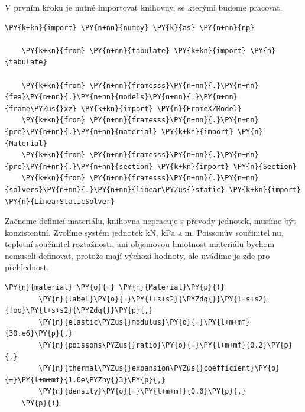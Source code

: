 V prvním kroku je nutné importovat knihovny, se kterými budeme pracovat.

\begin{tcolorbox}[breakable, size=fbox, boxrule=1pt, pad at break*=1mm,colback=cellbackground, colframe=cellborder]
    \begin{Verbatim}[commandchars=\\\{\}]
    \PY{k+kn}{import} \PY{n+nn}{numpy} \PY{k}{as} \PY{n+nn}{np}
    
    \PY{k+kn}{from} \PY{n+nn}{tabulate} \PY{k+kn}{import} \PY{n}{tabulate}
    
    \PY{k+kn}{from} \PY{n+nn}{framesss}\PY{n+nn}{.}\PY{n+nn}{fea}\PY{n+nn}{.}\PY{n+nn}{models}\PY{n+nn}{.}\PY{n+nn}{frame\PYZus{}xz} \PY{k+kn}{import} \PY{n}{FrameXZModel}
    \PY{k+kn}{from} \PY{n+nn}{framesss}\PY{n+nn}{.}\PY{n+nn}{pre}\PY{n+nn}{.}\PY{n+nn}{material} \PY{k+kn}{import} \PY{n}{Material}
    \PY{k+kn}{from} \PY{n+nn}{framesss}\PY{n+nn}{.}\PY{n+nn}{pre}\PY{n+nn}{.}\PY{n+nn}{section} \PY{k+kn}{import} \PY{n}{Section}
    \PY{k+kn}{from} \PY{n+nn}{framesss}\PY{n+nn}{.}\PY{n+nn}{solvers}\PY{n+nn}{.}\PY{n+nn}{linear\PYZus{}static} \PY{k+kn}{import} \PY{n}{LinearStaticSolver}
    \end{Verbatim}
\end{tcolorbox}

Začneme definicí materiálu, knihovna nepracuje s převody jednotek, musíme být konzistentní. Zvolíme systém jednotek $\text{kN, kPa a m}$. Poissonův součinitel \gls{nu}, teplotní součinitel roztažnosti, ani objemovou hmotnost materiálu bychom nemuseli definovat, protože mají výchozí hodnoty, ale uvádíme je zde pro přehlednost.
\begin{tcolorbox}[breakable, size=fbox, boxrule=1pt, pad at break*=1mm,colback=cellbackground, colframe=cellborder]
    \begin{Verbatim}[commandchars=\\\{\}]
    \PY{n}{material} \PY{o}{=} \PY{n}{Material}\PY{p}{(}
        \PY{n}{label}\PY{o}{=}\PY{l+s+s2}{\PYZdq{}}\PY{l+s+s2}{foo}\PY{l+s+s2}{\PYZdq{}}\PY{p}{,}
        \PY{n}{elastic\PYZus{}modulus}\PY{o}{=}\PY{l+m+mf}{30.e6}\PY{p}{,}
        \PY{n}{poissons\PYZus{}ratio}\PY{o}{=}\PY{l+m+mf}{0.2}\PY{p}{,}
        \PY{n}{thermal\PYZus{}expansion\PYZus{}coefficient}\PY{o}{=}\PY{l+m+mf}{1.0e\PYZhy{}3}\PY{p}{,}
        \PY{n}{density}\PY{o}{=}\PY{l+m+mf}{0.0}\PY{p}{,}
    \PY{p}{)}
    \end{Verbatim}
\end{tcolorbox}

